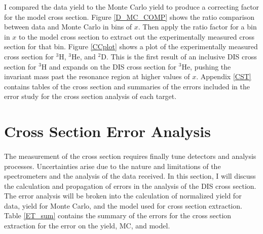 \iffalse
\begin{landscape}
\begin{figure}
	\hspace{-40pt}
	\texttt{[image: ../images/total\_xs\_L.pdf]}
	\caption{Experimentally measured cross section using the Monte Carlo ratio method for $^3$H, $^3$He, and $^2$D. Normalization uncertainty due to target thickness uncertainty for $^3$H= 0.97\%, $^3$He = 1.12\%, and $^2$D = 0.56\%.}
\end{figure}
\end{landscape}
\fi


I compared the data yield to the Monte Carlo yield to produce a correcting factor for the model cross section. Figure \ref{D_MC_COMP} shows the ratio comparison between data and Monte Carlo in bins of $x$. Then apply the ratio factor for a bin in $x$ to the model cross section to extract out the experimentally measured cross section for that bin. Figure \ref{CCplot} shows a plot of the experimentally measured cross section for $^3$H, $^3$He, and $^2$D.  This is the first result of an inclusive DIS cross section for $^3$H and expands on the DIS cross section for $^3$He, pushing the invariant mass past the resonance region at higher values of $x$.  Appendix \ref{CST} contains tables of the cross section and summaries of the errors included in the error study for the cross section analysis of each target. 
\section{Cross Section Error Analysis}
\paragraph{}The measurement of the cross section requires finally tune detectors and analysis processes. Uncertainties arise due to the nature and limitations of the spectrometers and the analysis of the data received. In this section, I will discuss the calculation and propagation of errors in the analysis of the DIS cross section. The error analysis will be broken into the calculation of normalized yield for data, yield for Monte Carlo, and the model used for cross section extraction. Table \ref{ET_sum} contains the summary of the errors for the cross section extraction for the error on the yield, MC, and model. 

